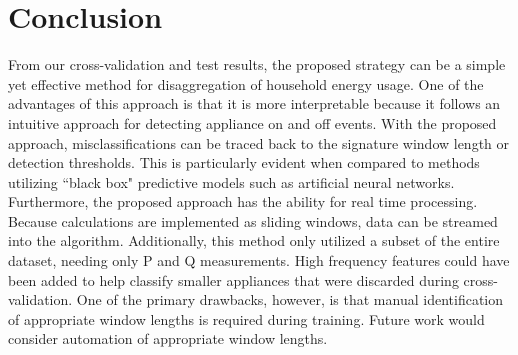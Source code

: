 \documentclass[conference]{IEEEtran}
\begin{document}
\section{Conclusion}\label{sec:concl}
From our cross-validation and test results, the proposed strategy can be a simple yet effective method for disaggregation of household energy usage. One of the advantages of this approach is that it is more interpretable because it follows an intuitive approach for detecting appliance on and off events.  With the proposed approach, misclassifications can be traced back to the signature window length or detection thresholds.  This is particularly evident when compared to methods utilizing ``black box" predictive models such as artificial neural networks.  Furthermore, the proposed approach has the ability for real time processing. Because calculations are implemented as sliding windows, data can be streamed into the algorithm. Additionally, this method only utilized a subset of the entire dataset, needing only P and Q measurements.  High frequency features could have been added to help classify smaller appliances that were discarded during cross-validation.  One of the primary drawbacks, however, is that manual identification of appropriate window lengths is required during training.  Future work would consider automation of appropriate window lengths.

	




%
%







%
%
%
\end{document}
